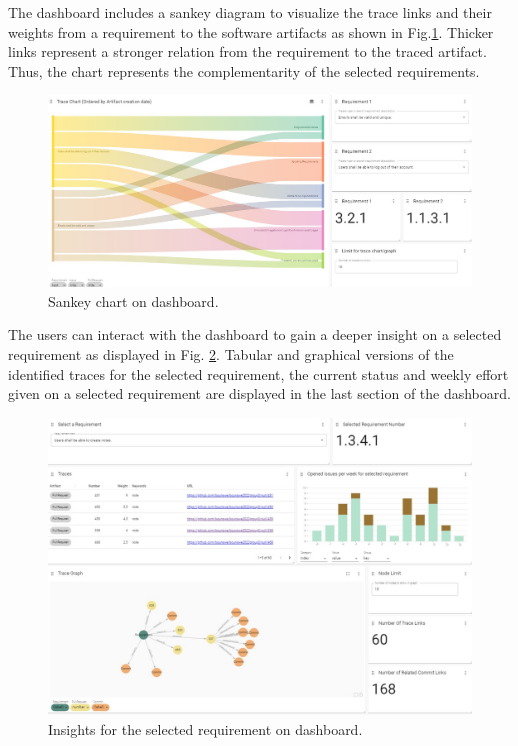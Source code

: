 The dashboard includes a sankey diagram to visualize the trace links and their weights from a requirement to the software artifacts as shown in Fig.\ref{fig:sankey}. %
Thicker links represent a stronger relation from the requirement to the traced artifact. Thus, the chart represents the complementarity of the selected requirements.

\begin{figure}[htb]
    \centering
    \includegraphics[width=.9\linewidth]{figs/sankey.jpg}
    \caption{Sankey chart on dashboard.}
    \label{fig:sankey}
\end{figure}

The users can interact with the dashboard to gain a deeper insight on a selected requirement as displayed in Fig. \ref{fig:perreq}. Tabular and graphical versions of the identified traces for the selected requirement, the current status and weekly effort given on a selected requirement are displayed in the last section of the dashboard.

\begin{figure}[htb]
    \centering
    \includegraphics[width=.9\linewidth]{figs/perreq.jpg}
    \caption{Insights for the selected requirement on dashboard.}
    \label{fig:perreq}
\end{figure}


